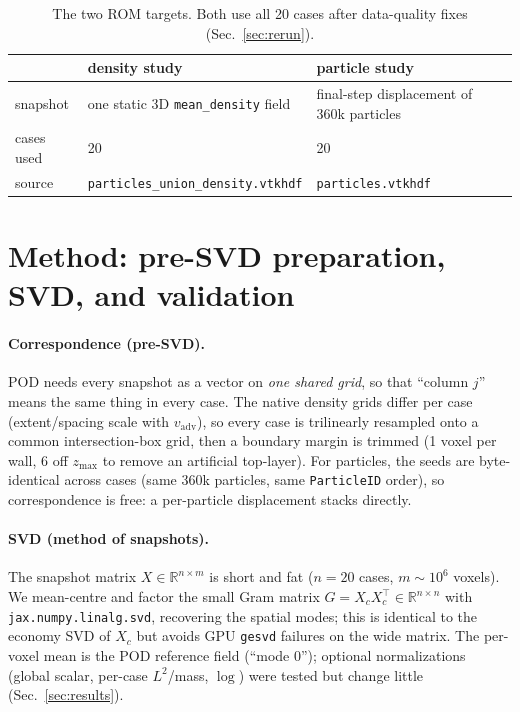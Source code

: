 \documentclass[11pt]{article}
\newcommand{\vadv}{v_{\mathrm{adv}}}
\begin{document}
\begin{table}[H]\centering
\begin{tabular}{lll}
\toprule
 & density study & particle study \\
\midrule
snapshot & one static 3D \texttt{mean\_density} field & final-step displacement of 360k particles \\
cases used & 20 & 20 \\
source & \texttt{particles\_union\_density.vtkhdf} & \texttt{particles.vtkhdf} \\
\bottomrule
\end{tabular}
\caption{The two ROM targets. Both use all 20 cases after data-quality
fixes (Sec.~\ref{sec:rerun}).}
\end{table}

\section{Method: pre-SVD preparation, SVD, and validation}

\paragraph{Correspondence (pre-SVD).}
POD needs every snapshot as a vector on \emph{one shared grid}, so that
``column $j$'' means the same thing in every case. The native density
grids differ per case (extent/spacing scale with $\vadv$), so every case
is trilinearly resampled onto a common intersection-box grid, then a
boundary margin is trimmed (1 voxel per wall, 6 off $z_{\max}$ to remove
an artificial top-layer). For particles, the seeds are byte-identical
across cases (same 360k particles, same \texttt{ParticleID} order), so
correspondence is free: a per-particle displacement stacks directly.

\paragraph{SVD (method of snapshots).}
The snapshot matrix $X\in\mathbb{R}^{n\times m}$ is short and fat
($n=20$ cases, $m\sim10^6$ voxels). We mean-centre and factor the small
Gram matrix $G=X_cX_c^{\top}\in\mathbb{R}^{n\times n}$ with
\texttt{jax.numpy.linalg.svd}, recovering the spatial modes; this is
identical to the economy SVD of $X_c$ but avoids GPU \texttt{gesvd}
failures on the wide matrix. The per-voxel mean is the POD reference
field (``mode 0''); optional normalizations (global scalar, per-case
$L^2$/mass, $\log$) were tested but change little (Sec.~\ref{sec:results}).
\end{document}
